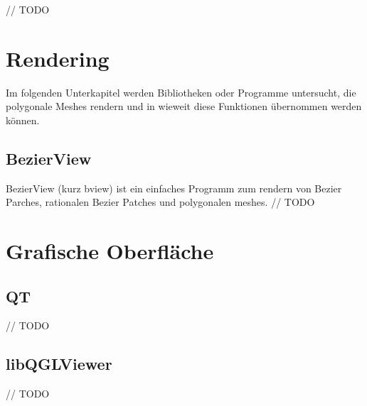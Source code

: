 // TODO

\section{Rendering}

Im folgenden Unterkapitel werden Bibliotheken oder Programme untersucht, die polygonale Meshes rendern
und in wieweit diese Funktionen übernommen werden können. 

\subsection{BezierView}

BezierView (kurz bview) ist ein einfaches Programm zum rendern von Bezier Parches, rationalen Bezier Patches und polygonalen meshes.
\cite{Peters.bview.27.07.2015}
// TODO

\section{Grafische Oberfläche}

\subsection{QT}

// TODO

\subsection{libQGLViewer}

// TODO
